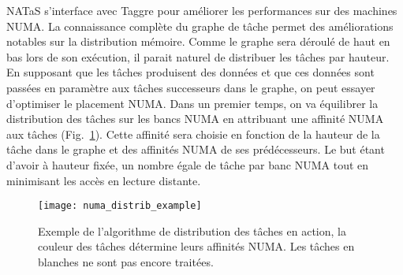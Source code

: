 NATaS s'interface avec Taggre pour améliorer les performances sur des machines NUMA.
%
La connaissance complète du graphe de tâche permet des améliorations notables sur la distribution mémoire.
%
Comme le graphe sera déroulé de haut en bas lors de son exécution, il parait naturel de distribuer les tâches par hauteur.
%
En supposant que les tâches produisent des données et que ces données sont passées en paramètre aux tâches successeurs dans le graphe, on peut essayer d'optimiser le placement NUMA.
%
Dans un premier temps, on va équilibrer la distribution des tâches sur les bancs NUMA en attribuant une affinité NUMA aux tâches (Fig.~\ref{fig:numa_distrib_example}).
%
Cette affinité sera choisie en fonction de la hauteur de la tâche dans le graphe et des affinités NUMA de ses prédécesseurs.
%
Le but étant d'avoir à hauteur fixée, un nombre égale de tâche par banc NUMA tout en minimisant les accès en lecture distante.

\begin{figure}[!h]
  \centering
  \texttt{[image: numa\_distrib\_example]}
  \caption{Exemple de l'algorithme de distribution des tâches en action, la couleur des tâches détermine leurs affinités NUMA. Les tâches en blanches ne sont pas encore traitées.}
  \label{fig:numa_distrib_example}
\end{figure}
